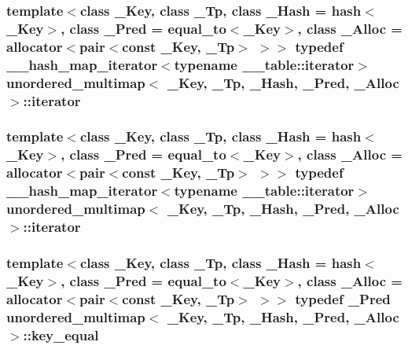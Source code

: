 \subsubsection[{iterator}]{\setlength{\rightskip}{0pt plus 5cm}template$<$class \+\_\+\+Key, class \+\_\+\+Tp, class \+\_\+\+Hash = hash$<$\+\_\+\+Key$>$, class \+\_\+\+Pred = equal\+\_\+to$<$\+\_\+\+Key$>$, class \+\_\+\+Alloc = allocator$<$pair$<$const \+\_\+\+Key, \+\_\+\+Tp$>$ $>$$>$ typedef {\bf \+\_\+\+\_\+hash\+\_\+map\+\_\+iterator}$<$typename \+\_\+\+\_\+table\+::iterator$>$ {\bf unordered\+\_\+multimap}$<$ \+\_\+\+Key, \+\_\+\+Tp, \+\_\+\+Hash, \+\_\+\+Pred, \+\_\+\+Alloc $>$\+::{\bf iterator}}\label{classunordered__multimap_a7b508cae41ac3a258ca80609ec43db47}
\hypertarget{classunordered__multimap_a7b508cae41ac3a258ca80609ec43db47}{}
\subsubsection[{iterator}]{\setlength{\rightskip}{0pt plus 5cm}template$<$class \+\_\+\+Key, class \+\_\+\+Tp, class \+\_\+\+Hash = hash$<$\+\_\+\+Key$>$, class \+\_\+\+Pred = equal\+\_\+to$<$\+\_\+\+Key$>$, class \+\_\+\+Alloc = allocator$<$pair$<$const \+\_\+\+Key, \+\_\+\+Tp$>$ $>$$>$ typedef {\bf \+\_\+\+\_\+hash\+\_\+map\+\_\+iterator}$<$typename \+\_\+\+\_\+table\+::iterator$>$ {\bf unordered\+\_\+multimap}$<$ \+\_\+\+Key, \+\_\+\+Tp, \+\_\+\+Hash, \+\_\+\+Pred, \+\_\+\+Alloc $>$\+::{\bf iterator}}\label{classunordered__multimap_a7b508cae41ac3a258ca80609ec43db47}
\hypertarget{classunordered__multimap_aeed817e3baaf0771b8336eb2477f4f02}{}
\subsubsection[{key\+\_\+equal}]{\setlength{\rightskip}{0pt plus 5cm}template$<$class \+\_\+\+Key, class \+\_\+\+Tp, class \+\_\+\+Hash = hash$<$\+\_\+\+Key$>$, class \+\_\+\+Pred = equal\+\_\+to$<$\+\_\+\+Key$>$, class \+\_\+\+Alloc = allocator$<$pair$<$const \+\_\+\+Key, \+\_\+\+Tp$>$ $>$$>$ typedef \+\_\+\+Pred {\bf unordered\+\_\+multimap}$<$ \+\_\+\+Key, \+\_\+\+Tp, \+\_\+\+Hash, \+\_\+\+Pred, \+\_\+\+Alloc $>$\+::{\bf key\+\_\+equal}}\label{classunordered__multimap_aeed817e3baaf0771b8336eb2477f4f02}
\hypertarget{classunordered__multimap_aeed817e3baaf0771b8336eb2477f4f02}{}
